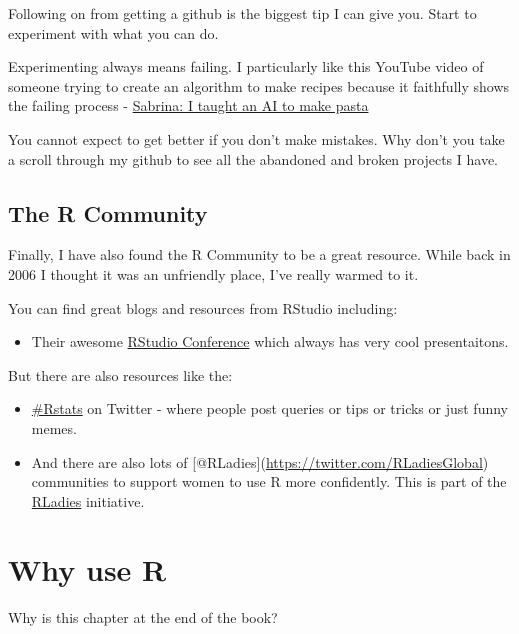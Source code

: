 \documentclass[
]{book}
\providecommand{\tightlist}{%
  \setlength{\itemsep}{0pt}\setlength{\parskip}{0pt}}
\begin{document}
Following on from getting a github is the biggest tip I can give you. Start to experiment with what you can do.

Experimenting always means failing. I particularly like this YouTube video of someone trying to create an algorithm to make recipes because it faithfully shows the failing process - \href{https://youtu.be/Y_NvR5dIaOY?list=LLJ1tgo7aEDCRH3FJF6IJMdA}{Sabrina: I taught an AI to make pasta}

You cannot expect to get better if you don't make mistakes. Why don't you take a scroll through my github to see all the abandoned and broken projects I have.

\hypertarget{the-r-community}{%
\section{The R Community}\label{the-r-community}}

Finally, I have also found the R Community to be a great resource. While back in 2006 I thought it was an unfriendly place, I've really warmed to it.

You can find great blogs and resources from RStudio including:

\begin{itemize}
\tightlist
\item
  Their awesome \href{https://rstudio.com/conference/}{RStudio Conference} which always has very cool presentaitons.
\end{itemize}

But there are also resources like the:

\begin{itemize}
\item
  \href{https://twitter.com/search?q=rstats\&src=typed_query}{\#Rstats} on Twitter - where people post queries or tips or tricks or just funny memes.
\item
  And there are also lots of {[}@RLadies{]}(\url{https://twitter.com/RLadiesGlobal}) communities to support women to use R more confidently. This is part of the \href{https://rladies.org/}{RLadies} initiative.
\end{itemize}

\hypertarget{whyr}{%
\chapter{Why use R}\label{whyr}}

Why is this chapter at the end of the book?
\end{document}
